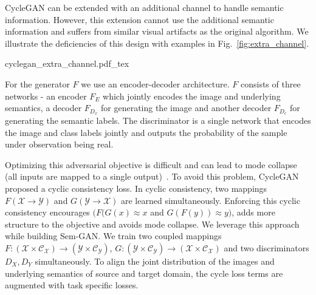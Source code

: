 CycleGAN can be extended with an additional channel to handle semantic information. However, this extension cannot use the additional semantic information and suffers from similar visual artifacts as the original algorithm. We illustrate the deficiencies of this design with examples in Fig.~\ref{fig:extra_channel}.

\begin{figure*}[!hbpt]
    \centering
    \def\svgwidth{\textwidth}
        {cyclegan_extra_channel.pdf_tex}
    \caption[Failure of trivial extension of CycleGAN]{The trivial extension of adding an extra channel in CycleGAN results in erroneous semantic translations. The network generates values between $0-255$ for both the target image and its mask, it generates arbitrary semantic labels for both binary (top row: translation from square to triangle/ circle to triangle) and multi-class (middle row: GTA$\to$ Cityscape, bottom row: Cityscape $\to$ GTA) test cases. Additionally, this technique is incapable of using the extra information available from the semantic labels and it produces similar visual artifacts like CycleGAN itself. Note that, for the GTA$\leftrightarrow$ Cityscapes examples in the figure, only four classes were used (people, road, car and ignore label).}
    \label{fig:extra_channel}
\end{figure*}

For the generator $F$ we use an encoder-decoder architecture. $F$ consists of three networks - an encoder $F_E$ which jointly encodes the image and underlying semantics, a decoder $F_{D_{x}}$ for generating the image and another decoder $F_{D_{c}}$ for generating the semantic labels. The discriminator is a single network that encodes the image and class labels jointly and outputs the probability of the sample under observation being real. 

Optimizing this adversarial objective is difficult and can lead to mode collapse (all inputs are mapped to a single output)~\cite{goodfellow_generative_2014}. To avoid this problem, CycleGAN~\cite{zhu_unpaired_2017} proposed a cyclic consistency loss. In cyclic consistency, two mappings $F(\mathcal{X} \to \mathcal{Y})$ and $G(\mathcal{Y} \to \mathcal{X})$ are learned simultaneously. Enforcing this cyclic consistency encourages $(F(G(x) \approx x$ and $G(F(y)) \approx y)$, adds more structure to the objective and avoids mode collapse. We leverage this approach while building Sem-GAN. We train two coupled mappings $F:\left(\mathcal{ X \times C_X}\right) \to \left(\mathcal{ Y \times C_Y}\right)$, $G:\left(\mathcal{ Y \times C_Y}\right) \to \left(\mathcal{ X \times C_X}\right)$ and two discriminators $D_X, D_Y$ simultaneously. To align the joint distribution of the images and underlying semantics of source and target domain, the cycle loss terms are augmented with task specific losses. 

